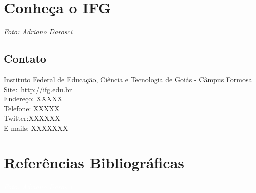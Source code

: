 \documentclass[11pt,fleqn]{book} %
\begin{document}
\chapter*{Conheça o IFG}
\vspace{6em}
\begin{flushright}
	\textit{{Foto: Adriano Darosci}}
\end{flushright}
\vspace{12em}

\section{Contato}

Instituto Federal de Educação, Ciência e Tecnologia de Goiás - Câmpus Formosa\\
Site:~\url{http://ifg.edu.br}\\
Endereço: XXXXX\\
Telefone: XXXXX \\
Twitter:XXXXXX \\
E-mails: XXXXXXX





%

\chapter*{Referências Bibliográficas}
\vspace{6em}
\begin{flushright}
	\textit{\textcolor{white}{Foto: Adriano Darosci}}
\end{flushright}
\vspace{12em}
\printbibliography[heading=bibempty]
\end{document}
